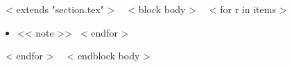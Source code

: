 ~< extends "section.tex" >~
~< block body >~
  ~< for r in items >~
    \vspace{-\baselineskip}
    \begin{itemize}
      ~< for note in r.notes >~
        \item{<< note >>}
      ~< endfor >~
    \end{itemize}
    \vspace{10pt}
  ~< endfor >~
  \vspace{-10pt}
~< endblock body >~
